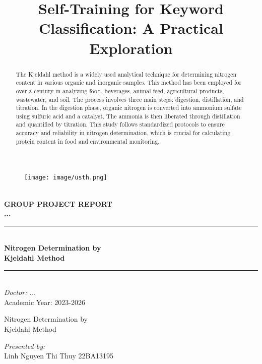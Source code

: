 \documentclass[hidelinks]{report}
\begin{document}
\begin{titlepage}
\begin{center}
\begin{figure}
    \centering
    \texttt{[image: image/usth.png]}
\end{figure}



\textsc{\Large }\\[1.5cm]
{\large \bfseries GROUP PROJECT REPORT}\\[0.5cm]

{\huge \bfseries \uppercase{...} \\[3cm] }


\rule{\linewidth}{0.3mm} \\[0.4cm]
{ \huge \bfseries\color{blue} Nitrogen Determination by \\ Kjeldahl Method \\[0.4cm] }
\rule{\linewidth}{0.3mm} \\[0.5cm]
\Large\textit{Doctor:} ...\\[0.3cm]
\large Academic Year: 2023-2026

    
    
\end{center}
\end{titlepage}



\clearpage
\title{Self-Training for Keyword Classification: A Practical Exploration}

\begin{titlepage}
    \begin{center}
    \null
    \vfill
        \huge Nitrogen Determination by \\ Kjeldahl Method
    \vfill
    \end{center}
    \raggedleft
    \textit{Presented by:}\mbox{}\\
    Linh Nguyen Thi Thuy    22BA13195 \\
    
    
    \centering
\end{titlepage}

\tableofcontents
\thispagestyle{empty} 

\clearpage
\pagestyle{plain} 
\setcounter{page}{1}

\begin{abstract}
    \LARGE \noindent The Kjeldahl method is a widely used analytical technique for determining nitrogen content in various organic and inorganic samples. This method has been employed for over a century in analyzing food, beverages, animal feed, agricultural products, wastewater, and soil. The process involves three main steps: digestion, distillation, and titration. In the digestion phase, organic nitrogen is converted into ammonium sulfate using sulfuric acid and a catalyst. The ammonia is then liberated through distillation and quantified by titration. This study follows standardized protocols to ensure accuracy and reliability in nitrogen determination, which is crucial for calculating protein content in food and environmental monitoring.
\end{abstract}
\end{document}
